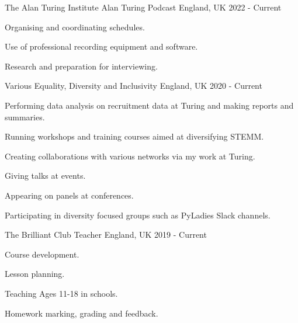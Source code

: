 



\begin{cventries}
  \cventry
    {The Alan Turing Institute}
    {Alan Turing Podcast} %
    {England, UK}
    {2022 - Current}
    { \begin{cvitems} %
        \item {Organising and coordinating schedules.}
        \item {Use of professional recording equipment and software.}
        \item {Research and preparation for interviewing.}
      \end{cvitems}} %

  \cventry
    {Various}
    {Equality, Diversity and Inclusivity} %
    {England, UK}
    {2020 - Current}
    {
    \begin{cvitems} %
        \item {Performing data analysis on recruitment data at Turing and making reports and summaries.}
        \item {Running workshops and training courses aimed at diversifying STEMM.}
        \item {Creating collaborations with various networks via my work at Turing.}
        \item {Giving talks at events.}
        \item {Appearing on panels at conferences.}
        \item {Participating in diversity focused groups such as PyLadies Slack channels.}
      \end{cvitems} } %
    
   \cventry
    {The Brilliant Club}
    {Teacher} %
    {England, UK}
    {2019 - Current}
    {\begin{cvitems} %
        \item {Course development.}
        \item {Lesson planning.}
        \item {Teaching Ages 11-18 in schools.}
        \item {Homework marking, grading and feedback.}
      \end{cvitems}} %


\end{cventries}
